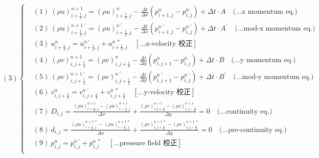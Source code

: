 \documentclass[12pt]{article}
\begin{document}
\begin{equation}
(3)
\left\{
\begin{aligned}
    &(1)\ (\rho u)_{i+\frac{1}{2},j}^{n+1} = (\rho u)_{i+\frac{1}{2},j}^{n} - \frac{\Delta t}{\Delta x}(p_{i+1,j}^{n} - p_{i,j}^{n}) + \Delta t \cdot A  \quad \text{(...x momentum eq.)}\\[1.5ex]
    &(2)\ (\rho u)_{i+\frac{1}{2},j}^{n+1\ \prime} = (\rho u)_{i+\frac{1}{2},j}^{n\ \prime} - \frac{\Delta t}{\Delta x}(p_{i+1,j}^{n\ \prime} - p_{i,j}^{n\ \prime}) + \Delta t \cdot A^{\prime}  \quad \text{(...mod-x momentum eq.)}\\[1.5ex]
    &(3)\ u_{i+\frac{1}{2},j}^{n} = u_{i+\frac{1}{2},j}^{n\ \prime} + u_{i+\frac{1}{2},j}^{n\ *}  \quad \left[\text{...x-velocity 校正}\right]\\[1.5ex]
    &(4)\ (\rho v)_{i,j+\frac{1}{2}}^{n+1} = (\rho v)_{i,j+\frac{1}{2}}^{n} - \frac{\Delta t}{\Delta y}(p_{i,j+1}^{n} - p_{i,j}^{n}) + \Delta t \cdot B  \quad \text{(...y momentum eq.)}\\[1.5ex]
    &(5)\ (\rho v)_{i,j+\frac{1}{2}}^{n+1\ \prime} = (\rho v)_{i,j+\frac{1}{2}}^{n\ \prime} - \frac{\Delta t}{\Delta y}(p_{i,j+1}^{n\ \prime} - p_{i,j}^{n\ \prime}) + \Delta t \cdot B^{\prime}  \quad \text{(...mod-y momentum eq.)}\\[1.5ex]
    &(6)\ v_{i,j+\frac{1}{2}}^{n} = v_{i,j+\frac{1}{2}}^{n\ \prime} + v_{i,j+\frac{1}{2}}^{n\ *} \quad \left[\text{...y-velocity 校正}\right]\\[1.5ex]
    &(7)\ D_{i,j} = \frac{(\rho u)_{i+\frac{1}{2},j}^{n+1} - (\rho u)_{i-\frac{1}{2},j}^{n+1}}{\Delta x} + \frac{(\rho v)_{i,j+\frac{1}{2}}^{n+1} - (\rho v)_{i,j-\frac{1}{2}}^{n+1}}{\Delta y} = 0 \quad \text{(...continuity eq.)}\\[1.5ex]
    &(8)\ d_{i,j} = \frac{(\rho u)_{i+\frac{1}{2},j}^{n+1\ *} - (\rho u)_{i-\frac{1}{2},j}^{n+1\ *}}{\Delta x} + \frac{(\rho v)_{i,j+\frac{1}{2}}^{n+1\ *} - (\rho v)_{i,j-\frac{1}{2}}^{n+1\ *}}{\Delta y} = 0 \quad \text{(...pre-continuity eq.)}\\[1.5ex]
    &(9)\ p_{i,j}^{n} = p_{i,j}^{n\ \prime} + p_{i,j}^{n\ *} \quad\left[\text{...pressure field 校正}\right]\\[1.5ex]
\end{aligned}
\right.
\end{equation}
\newpage
\end{document}
